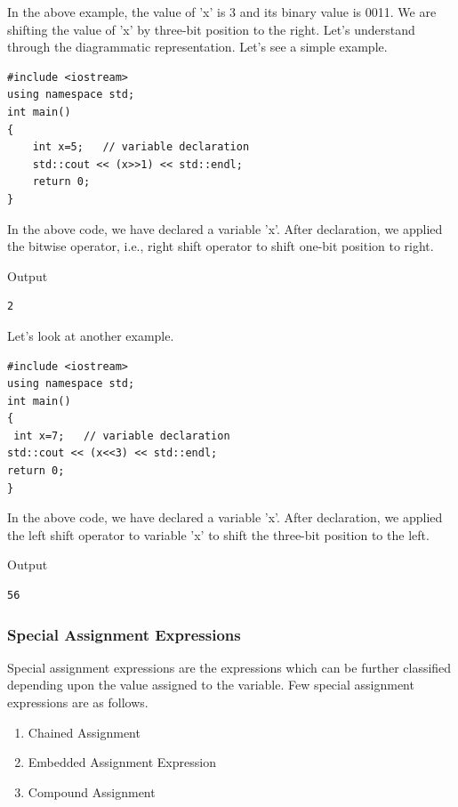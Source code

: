 \documentclass{book}
\begin{document}
In the above example, the value of 'x' is 3 and its binary value is 0011. We are shifting the value of 'x' by three-bit position to the right. Let's understand through the diagrammatic representation. Let's see a simple example.

\begin{lstlisting}
#include <iostream>  
using namespace std;  
int main()  
{  
	int x=5;   // variable declaration  
	std::cout << (x>>1) << std::endl;  
	return 0;  
}  
\end{lstlisting}

In the above code, we have declared a variable 'x'. After declaration, we applied the bitwise operator, i.e., right shift operator to shift one-bit position to right.

Output

\begin{verbatim}
2
\end{verbatim}

Let's look at another example.

\begin{lstlisting}
#include <iostream>  
using namespace std;  
int main()  
{  
 int x=7;   // variable declaration  
std::cout << (x<<3) << std::endl;  
return 0;  
}  
\end{lstlisting}

In the above code, we have declared a variable 'x'. After declaration, we applied the left shift operator to variable 'x' to shift the three-bit position to the left.

Output

\begin{Verbatim}
56
\end{Verbatim}

\subsubsection{Special Assignment Expressions}

Special assignment expressions are the expressions which can be further classified depending upon the value assigned to the variable. Few special assignment expressions are as follows. 

\begin{enumerate}
	\item Chained Assignment
	\item Embedded Assignment Expression
	\item Compound Assignment
\end{enumerate}
\end{document}
